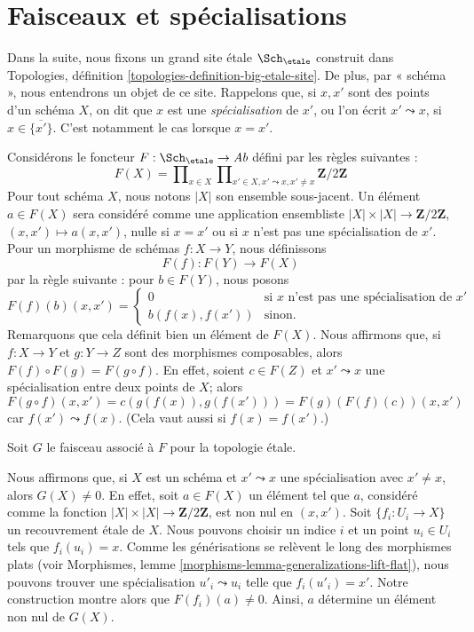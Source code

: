 \section{Faisceaux et spécialisations}
\label{section-sheaves}

\noindent
Dans la suite, nous fixons un grand site \'etale $\Sch_\etale$
construit dans
Topologies, définition \ref{topologies-definition-big-etale-site}.
De plus, par « schéma », nous entendrons un objet de ce site.
Rappelons que, si $x, x'$ sont des points d'un schéma $X$, on dit que $x$ est une
{\it spécialisation} de $x'$, ou l'on écrit $x' \leadsto x$, si
$x \in \overline{\{x'\}}$. C'est notamment le cas lorsque $x = x'$.

\medskip\noindent
Considérons le foncteur $F : \Sch_\etale \to \textit{Ab}$
défini par les règles suivantes :
$$
F(X) = \prod\nolimits_{x \in X}
\prod\nolimits_{x' \in X, x' \leadsto x, x' \not = x}
\mathbf{Z}/2\mathbf{Z}
$$
Pour tout schéma $X$, nous notons $|X|$ son ensemble sous-jacent.
Un élément $a \in F(X)$ sera considéré comme une application ensembliste
$|X| \times |X| \to \mathbf{Z}/2\mathbf{Z}$, $(x, x') \mapsto a(x, x')$,
nulle si $x = x'$ ou si $x$ n'est pas une spécialisation de $x'$.
Pour un morphisme de schémas $f : X \to Y$, nous définissons
$$
F(f) : F(Y) \longrightarrow F(X)
$$
par la règle suivante : pour $b \in F(Y)$, nous posons
$$
F(f)(b)(x, x') =
\left\{
\begin{matrix}
0 & \text{si }x\text{ n'est pas une spécialisation de }x' \\
b(f(x), f(x')) & \text{sinon.}
\end{matrix}
\right.
$$
Remarquons que cela définit bien un élément de $F(X)$. Nous affirmons que, si
$f : X \to Y$ et $g : Y \to Z$ sont des morphismes composables, alors
$F(f) \circ F(g) = F(g \circ f)$. En effet, soient $c \in F(Z)$ et
$x' \leadsto x$ une spécialisation entre deux points de $X$; alors
$$
F(g \circ f)(x, x') = c(g(f(x)), g(f(x'))) = F(g)(F(f)(c))(x, x')
$$
car $f(x') \leadsto f(x)$. (Cela vaut aussi si $f(x) = f(x')$.)

\medskip\noindent
Soit $G$ le faisceau associé à $F$ pour la topologie \'etale.

\medskip\noindent
Nous affirmons que, si $X$ est un schéma et $x' \leadsto x$ une spécialisation
avec $x' \not = x$, alors $G(X) \not = 0$. En effet, soit $a \in F(X)$
un élément tel que $a$, considéré comme la fonction
$|X| \times |X| \to \mathbf{Z}/2\mathbf{Z}$, est non nul en $(x, x')$.
Soit $\{f_i : U_i \to X\}$ un recouvrement \'etale de $X$. Nous pouvons choisir un
indice $i$ et un point $u_i \in U_i$ tels que $f_i(u_i) = x$. Comme les générisations
se relèvent le long des morphismes plats (voir
Morphismes, lemme \ref{morphisms-lemma-generalizations-lift-flat}),
nous pouvons trouver une spécialisation $u'_i \leadsto u_i$
telle que $f_i(u'_i) = x'$. Notre construction montre alors que
$F(f_i)(a) \not = 0$. Ainsi, $a$ détermine un élément non nul de $G(X)$.

